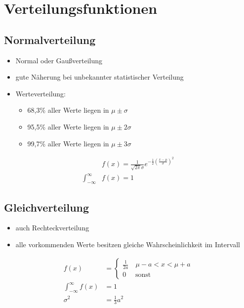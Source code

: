 \section{Verteilungsfunktionen}
	\subsection*{Normalverteilung}
	\begin{itemize}
	  \item Normal oder Gaußverteilung
	  \item gute Näherung bei unbekannter statistischer Verteilung
	  \item Werteverteilung: \begin{itemize}
	    \item 68,3\% aller Werte liegen in \( \mu \pm \sigma \)
	    \item 95,5\% aller Werte liegen in \( \mu \pm 2\sigma \)
	    \item 99,7\% aller Werte liegen in \( \mu \pm 3\sigma \) 
	  \end{itemize}
	\end{itemize}
	
	\begin{align*}
		&f\left( x \right) = \frac{1}{\sqrt{2 \pi} \sigma} e^{-\frac{1}{2}\left(
		\frac{x - \mu}{\sigma} \right)^2}\\
		\int_{-\infty}^{\infty} &f\left( x \right) = 1
	\end{align*}

	\subsection*{Gleichverteilung}
	\begin{itemize}
	  \item auch Rechteckverteilung
	  \item alle vorkommenden Werte besitzen gleiche Wahrscheinlichkeit im
	  Intervall
	\end{itemize}
	
	\begin{align*}
		f\left( x \right) &= 
			\begin{cases}
				\frac{1}{2a} \quad \mu - a < x < \mu + a\\
				0 \quad \text{ sonst}
			\end{cases}\\
		\int_{-\infty}^{\infty}f\left(x\right) &= 1\\
		\sigma^2 &= \frac{1}{3}a^2
	\end{align*}
	

